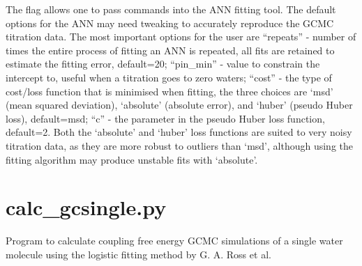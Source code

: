 \documentclass[letterpaper,10pt,english]{sphinxmanual}
\begin{document}
The flag  allows one to pass commands into the ANN fitting tool. The default options for the ANN may need tweaking to accurately reproduce the GCMC titration data. The most important options for the user are “repeats” - number of times the entire process of fitting an ANN is repeated, all fits are retained to estimate the fitting error, default=20; “pin\_min” - value to constrain the intercept to, useful when a titration goes to zero waters; “cost” - the type of cost/loss function that is minimised when fitting, the three choices are ‘msd’ (mean squared deviation), ‘absolute’ (absolute error), and ‘huber’ (pseudo Huber loss), default=msd; “c” - the parameter in the pseudo Huber loss function, default=2. Both the ‘absolute’ and ‘huber’ loss functions are suited to very noisy titration data, as they are more robust to outliers than ‘msd’, although using  the fitting algorithm may produce unstable fits with ‘absolute’.


\section{calc\_gcsingle.py}
\label{\detokenize{tools:calc-gcsingle-py}}

Program to calculate coupling free energy GCMC simulations of a single water molecule using the logistic fitting method by G. A. Ross et al.


%
\begin{sphinxVerbatim}[commandchars=\\\{\}]
  \PYG{p}{[}\PYG{p}{]} \PYG{p}{[}  \PYG{p}{[} \PYG{p}{]}\PYG{p}{]} \PYG{p}{[} \PYG{p}{]}
                        \PYG{p}{[} \PYG{p}{]} \PYG{p}{[} \PYG{p}{]} \PYG{p}{[}\PYG{p}{]} \PYG{p}{[} \PYG{p}{]} \PYG{p}{[}\PYG{p}{]}
                        \PYG{p}{[} \PYG{p}{]}
\end{sphinxVerbatim}
\end{document}
